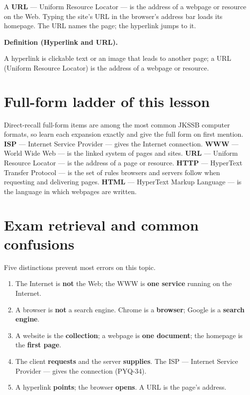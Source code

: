 \documentclass[11pt]{article}
\newenvironment{definitionbox}[1]{%
  \par\noindent\textbf{Definition (#1).}\ \itshape
}{\par\vspace{0.3em}}
\begin{document}
A \textbf{URL} --- Uniform Resource Locator --- is the address of a webpage
or resource on the Web. Typing the site's URL in the browser's address bar
loads its homepage. The URL names the page; the hyperlink jumps to it.

\begin{definitionbox}{Hyperlink and URL}
A hyperlink is clickable text or an image that leads to another page; a URL
(Uniform Resource Locator) is the address of a webpage or resource.
\end{definitionbox}

\section{Full-form ladder of this lesson}
Direct-recall full-form items are among the most common JKSSB computer
formats, so learn each expansion exactly and give the full form on first
mention. \textbf{ISP} --- Internet Service Provider --- gives the Internet
connection. \textbf{WWW} --- World Wide Web --- is the linked system of
pages and sites. \textbf{URL} --- Uniform Resource Locator --- is the address
of a page or resource. \textbf{HTTP} --- HyperText Transfer Protocol --- is
the set of rules browsers and servers follow when requesting and delivering
pages. \textbf{HTML} --- HyperText Markup Language --- is the language in
which webpages are written.

\section{Exam retrieval and common confusions}
Five distinctions prevent most errors on this topic.
\begin{enumerate}
  \item The Internet is \textbf{not} the Web; the WWW is \textbf{one
    service} running on the Internet.
  \item A browser is \textbf{not} a search engine. Chrome is a
    \textbf{browser}; Google is a \textbf{search engine}.
  \item A website is the \textbf{collection}; a webpage is \textbf{one
    document}; the homepage is the \textbf{first page}.
  \item The client \textbf{requests} and the server \textbf{supplies}. The
    ISP --- Internet Service Provider --- gives the connection (PYQ-34).
  \item A hyperlink \textbf{points}; the browser \textbf{opens}. A URL is the
    page's address.
\end{enumerate}
\end{document}
